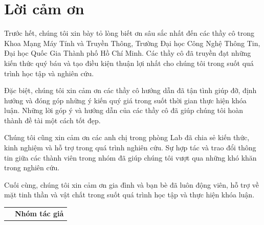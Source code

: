 \chapter*{Lời cảm ơn}

Trước hết, chúng tôi xin bày tỏ lòng biết ơn sâu sắc nhất đến các thầy cô trong Khoa Mạng Máy Tính và Truyền Thông, Trường Đại học Công Nghệ Thông Tin, Đại học Quốc Gia Thành phố Hồ Chí Minh. Các thầy cô đã truyền đạt những kiến thức quý báu và tạo điều kiện thuận lợi nhất cho chúng tôi trong suốt quá trình học tập và nghiên cứu.

Đặc biệt, chúng tôi xin cảm ơn các thầy cô hướng dẫn đã tận tình giúp đỡ, định hướng và đóng góp những ý kiến quý giá trong suốt thời gian thực hiện khóa luận. Những lời góp ý và hướng dẫn của các thầy cô đã giúp chúng tôi hoàn thành đề tài một cách tốt đẹp.

Chúng tôi cũng xin cảm ơn các anh chị trong phòng Lab đã chia sẻ kiến thức, kinh nghiệm và hỗ trợ trong quá trình nghiên cứu. Sự hợp tác và trao đổi thông tin giữa các thành viên trong nhóm đã giúp chúng tôi vượt qua những khó khăn trong nghiên cứu.

Cuối cùng, chúng tôi xin cảm ơn gia đình và bạn bè đã luôn động viên, hỗ trợ về mặt tinh thần và vật chất trong suốt quá trình học tập và thực hiện khóa luận.

\begin{table}[ht]
    \centering
    \begin{tabular}{>{\centering}m{}>{\centering\arraybackslash}m{}}
        & \textbf{Nhóm tác giả}
    \end{tabular}
\end{table}